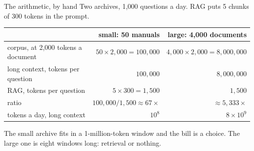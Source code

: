 \begin{frame}{The arithmetic, by hand}
  \vspace{0.2em}
  Two archives, 1{,}000 questions a day. RAG puts 5 chunks of 300 tokens in the prompt.

  \vspace{0.3em}
  \begin{center}
  \small
  \begin{tabular}{lrr}
    \toprule
    & \textbf{small: 50 manuals} & \textbf{large: 4{,}000 documents} \\
    \midrule
    corpus, at 2{,}000 tokens a document & $50 \times 2{,}000 = 100{,}000$ & $4{,}000 \times 2{,}000 = 8{,}000{,}000$ \\
    long context, tokens per question & $100{,}000$ & $8{,}000{,}000$ \\
    RAG, tokens per question & $5 \times 300 = 1{,}500$ & $1{,}500$ \\
    ratio & $100{,}000 / 1{,}500 \approx 67\times$ & $\approx 5{,}333\times$ \\
    tokens a day, long context & $10^{8}$ & $8 \times 10^{9}$ \\
    \bottomrule
  \end{tabular}
  \end{center}

  \vspace{0.3em}
  {\small The small archive fits in a 1-million-token window and the bill is a choice. The large
  one is eight windows long: retrieval or nothing.}

  \vspace{0.2em}
\end{frame}

